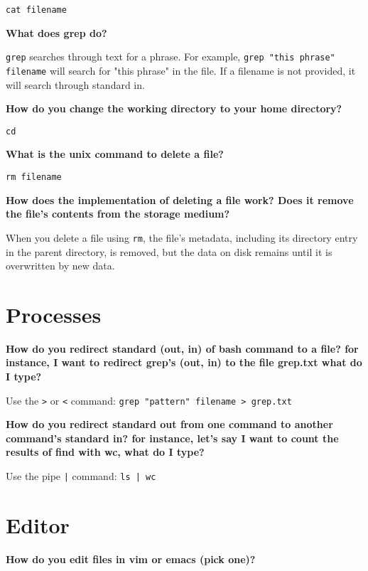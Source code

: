 \documentclass{article}
\newcommand{\inlinecode}[1]{\colorbox{gray!20}{\texttt{#1}}}
\begin{document}
\begin{verbatim}
cat filename
\end{verbatim}

\textbf{What does grep do?}
\vspace{0.5em}

\inlinecode{grep} searches through text for a phrase. For example,
\inlinecode{grep "this phrase" filename} will search for "this phrase" in the file. If a filename
is not provided, it will search through standard in.

\vspace{1em}
\textbf{How do you change the working directory to your home directory?}

\begin{verbatim}
cd
\end{verbatim}

\textbf{What is the unix command to delete a file?}

\begin{verbatim}
rm filename
\end{verbatim}

\textbf{How does the implementation of deleting a file work? Does it remove the file's contents
from the storage medium?}
\vspace{0.5em}

When you delete a file using \inlinecode{rm}, the file's metadata, including its directory entry in
the parent directory, is removed, but the data on disk remains until it is overwritten by new data.

\section*{Processes}
\textbf{How do you redirect standard (out, in) of bash command to a file? for instance, I want to
redirect grep's (out, in) to the file grep.txt what do I type?}
\vspace{0.5em}

Use the \inlinecode{>} or \inlinecode{<} command: \inlinecode{grep "pattern" filename > grep.txt}

\vspace{1em}
\textbf{How do you redirect standard out from one command to another command's standard in? for
instance, let's say I want to count the results of find with wc, what do I type?}
\vspace{0.5em}

Use the pipe \inlinecode{|} command: \inlinecode{ls | wc}

\section*{Editor}
\textbf{How do you edit files in vim or emacs (pick one)?}
\end{document}
